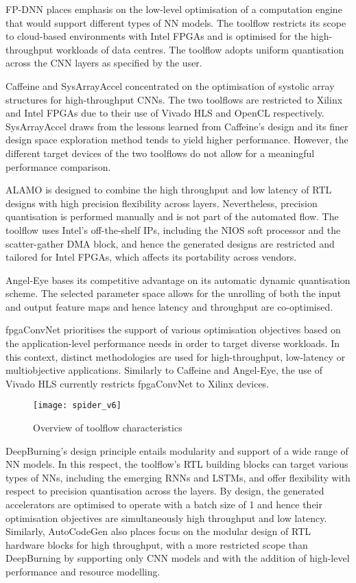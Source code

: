 \documentclass[format=acmsmall, review=false, screen=true]{acmart}
\begin{document}
FP-DNN places emphasis on the low-level optimisation of a computation engine that would support different types of NN models. The toolflow restricts its scope to cloud-based environments with Intel FPGAs and is optimised for the high-throughput workloads of data centres. The toolflow adopts uniform quantisation across the CNN layers as specified by the user.

Caffeine and SysArrayAccel concentrated on the optimisation of systolic array structures for high-throughput CNNs. The two toolflows are restricted to Xilinx and Intel FPGAs due to their use of Vivado HLS and OpenCL respectively. SysArrayAccel draws from the lessons learned from Caffeine's design and its finer design space exploration method tends to yield higher performance. However, the different target devices of the two toolflows do not allow for a meaningful performance comparison.

ALAMO is designed to combine the high throughput and low latency of RTL designs with high precision flexibility across layers. Nevertheless, precision quantisation is performed manually and is not part of the automated flow. The toolflow uses Intel's off-the-shelf IPs, including the NIOS soft processor and the scatter-gather DMA block, and hence the generated designs are restricted and tailored for Intel FPGAs, which affects its portability across vendors.

Angel-Eye bases its competitive advantage on its automatic dynamic quantisation scheme. The selected parameter space allows for the unrolling of both the input and output feature maps and hence latency and throughput are co-optimised.

fpgaConvNet prioritises the support of various optimisation objectives based on the application-level performance needs in order to target diverse workloads. In this context, distinct methodologies are used for high-throughput, low-latency or multiobjective applications. Similarly to Caffeine and Angel-Eye, the use of Vivado HLS currently restricts fpgaConvNet to Xilinx devices. 

 
 \begin{figure}[t] %
    \vspace{-0.5cm}
	\centering
	\texttt{[image: spider\_v6]}
	\caption{Overview of toolflow characteristics}
	\label{fig:spider}
	\vspace{-0.5cm}
\end{figure}

DeepBurning's design principle entails modularity and support of a wide range of NN models. In this respect, the toolflow's RTL building blocks can target various types of NNs, including the emerging RNNs and LSTMs, and offer flexibility with respect to precision quantisation across the layers. By design, the generated accelerators are optimised to operate with a batch size of 1 and hence their optimisation objectives are simultaneously high throughput and low latency. {\color{black}Similarly, AutoCodeGen also places focus on the modular design of RTL hardware blocks for high throughput, with a more restricted scope than DeepBurning by supporting only CNN models and with the addition of high-level performance and resource modelling.}
\end{document}
